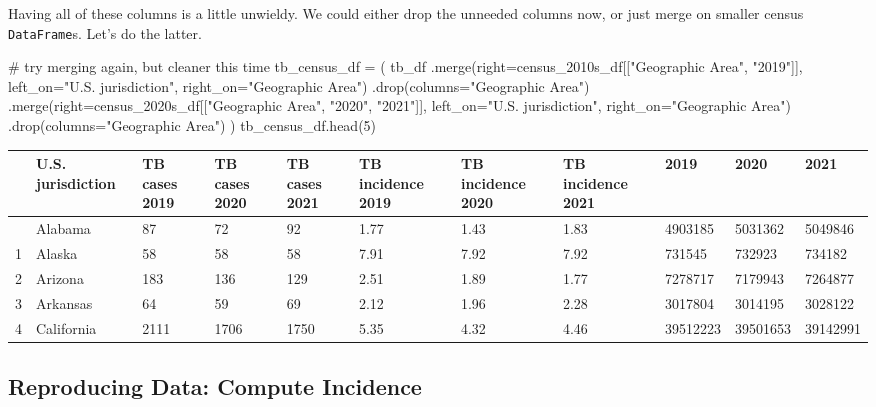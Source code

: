 \documentclass[
  letterpaper,
  DIV=11,
  numbers=noendperiod]{scrreprt}
\newenvironment{Shaded}{\begin{snugshade}}{\end{snugshade}}
\newcommand{\CommentTok}[1]{\textcolor[rgb]{0.37,0.37,0.37}{#1}}
\newcommand{\DecValTok}[1]{\textcolor[rgb]{0.68,0.00,0.00}{#1}}
\newcommand{\NormalTok}[1]{\textcolor[rgb]{0.00,0.23,0.31}{#1}}
\newcommand{\OperatorTok}[1]{\textcolor[rgb]{0.37,0.37,0.37}{#1}}
\newcommand{\StringTok}[1]{\textcolor[rgb]{0.13,0.47,0.30}{#1}}
\begin{document}
Having all of these columns is a little unwieldy. We could either drop
the unneeded columns now, or just merge on smaller census
\texttt{DataFrame}s. Let's do the latter.

\begin{Shaded}
\begin{Highlighting}[]
\CommentTok{\# try merging again, but cleaner this time}
\NormalTok{tb\_census\_df }\OperatorTok{=}\NormalTok{ (}
\NormalTok{    tb\_df}
\NormalTok{    .merge(right}\OperatorTok{=}\NormalTok{census\_2010s\_df[[}\StringTok{"Geographic Area"}\NormalTok{, }\StringTok{"2019"}\NormalTok{]],}
\NormalTok{           left\_on}\OperatorTok{=}\StringTok{"U.S. jurisdiction"}\NormalTok{, right\_on}\OperatorTok{=}\StringTok{"Geographic Area"}\NormalTok{)}
\NormalTok{    .drop(columns}\OperatorTok{=}\StringTok{"Geographic Area"}\NormalTok{)}
\NormalTok{    .merge(right}\OperatorTok{=}\NormalTok{census\_2020s\_df[[}\StringTok{"Geographic Area"}\NormalTok{, }\StringTok{"2020"}\NormalTok{, }\StringTok{"2021"}\NormalTok{]],}
\NormalTok{           left\_on}\OperatorTok{=}\StringTok{"U.S. jurisdiction"}\NormalTok{, right\_on}\OperatorTok{=}\StringTok{"Geographic Area"}\NormalTok{)}
\NormalTok{    .drop(columns}\OperatorTok{=}\StringTok{"Geographic Area"}\NormalTok{)}
\NormalTok{)}
\NormalTok{tb\_census\_df.head(}\DecValTok{5}\NormalTok{)}
\end{Highlighting}
\end{Shaded}

\begin{longtable}[]{@{}lllllllllll@{}}
\toprule\noalign{}
& U.S. jurisdiction & TB cases 2019 & TB cases 2020 & TB cases 2021 & TB
incidence 2019 & TB incidence 2020 & TB incidence 2021 & 2019 & 2020 &
2021 \\
\midrule\noalign{}
\endhead
\bottomrule\noalign{}
\endlastfoot
0 & Alabama & 87 & 72 & 92 & 1.77 & 1.43 & 1.83 & 4903185 & 5031362 &
5049846 \\
1 & Alaska & 58 & 58 & 58 & 7.91 & 7.92 & 7.92 & 731545 & 732923 &
734182 \\
2 & Arizona & 183 & 136 & 129 & 2.51 & 1.89 & 1.77 & 7278717 & 7179943 &
7264877 \\
3 & Arkansas & 64 & 59 & 69 & 2.12 & 1.96 & 2.28 & 3017804 & 3014195 &
3028122 \\
4 & California & 2111 & 1706 & 1750 & 5.35 & 4.32 & 4.46 & 39512223 &
39501653 & 39142991 \\
\end{longtable}

\subsection{Reproducing Data: Compute
Incidence}\label{reproducing-data-compute-incidence}
\end{document}
